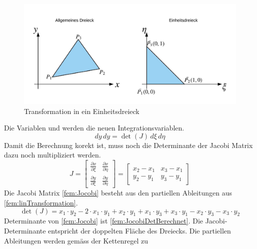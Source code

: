 \begin{figure}[h!]
	\centering
	\includegraphics[scale=0.8]{papers/fem/Images/Dreiecke.jpeg}
	\caption{Transformation in ein Einheitsdreieck}
	\label{fig:TransformationEinheitsdreieckBild}
\end{figure}
Die Variablen \xi und \eta werden die neuen Integrationsvariablen.
\begin{equation}
			dy \, dy = \det(J) \, d\xi \, d\eta
			\label{fem:newTransformation}
\end{equation}
Damit die Berechnung korekt ist, muss noch die Determinante der Jacobi Matrix dazu noch multipliziert werden.
\begin{equation}
J %
=
\begin{bmatrix}
    \frac{\partial x}{\partial \xi} &  \frac{\partial x}{\partial \eta}     \\
   \frac{\partial y}{\partial \xi}  &  \frac{\partial y}{\partial \eta}     
\end{bmatrix}
= 
\begin{bmatrix}
    x_2 - x_1  &  x_3 -x_1      \\
    y_2 - y_1  &  y_3 - y_1      
\end{bmatrix} 
	\label{fem:Jocobi}
\end{equation}
Die Jacobi Matrix \ref{fem:Jocobi} besteht aus den partiellen Ableitungen aus \ref{fem:linTransformation}.  
\begin{equation}
	\det(J) = x_1 \cdot y_2 - 2 \cdot x_1 \cdot y_1 + x_2 \cdot y_1 + x_1\cdot y_3 + x_3 \cdot y_1 - x_2 \cdot y_3 - x_3 \cdot y_2
	\label{fem:JocobiDetBerechnet}
\end{equation}
Determinante von \ref{fem:Jocobi} ist \eqref{fem:JocobiDetBerechnet}. Die Jacobi- Determinante entspricht der doppelten Fläche des Dreiecks. Die partiellen Ableitungen werden gemäss der Kettenregel zu 
